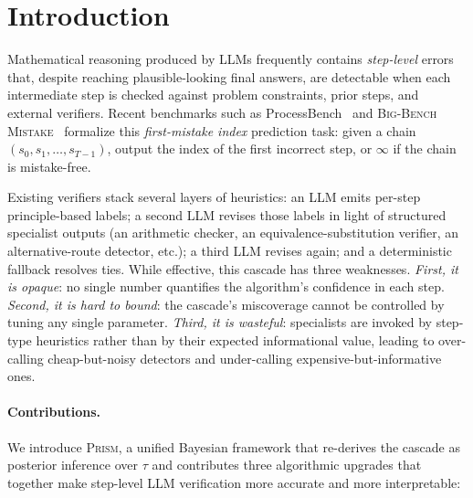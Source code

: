 \documentclass[11pt,a4paper]{article}
\theoremstyle{plain}
\theoremstyle{definition}
\theoremstyle{remark}
\begin{document}
\section{Introduction}
\label{sec:intro}

Mathematical reasoning produced by LLMs frequently contains
\emph{step-level} errors that, despite reaching plausible-looking final
answers, are detectable when each intermediate step is checked against
problem constraints, prior steps, and external verifiers. Recent
benchmarks such as ProcessBench~\citep{zheng2024processbench} and
\textsc{Big-Bench Mistake}~\citep{tyen2024llms} formalize this
\emph{first-mistake index} prediction task: given a chain
$(s_0,s_1,\dots,s_{T-1})$, output the index of the first incorrect
step, or $\infty$ if the chain is mistake-free.

Existing verifiers stack several layers of heuristics: an LLM emits
per-step principle-based labels; a second LLM revises those labels in
light of structured specialist outputs (an arithmetic checker, an
equivalence-substitution verifier, an alternative-route detector,
etc.); a third LLM revises again; and a deterministic fallback
resolves ties. While effective, this cascade has three weaknesses.
\emph{First, it is opaque}: no single number quantifies the
algorithm's confidence in each step. \emph{Second, it is hard to
bound}: the cascade's miscoverage cannot be controlled by tuning any
single parameter. \emph{Third, it is wasteful}: specialists are
invoked by step-type heuristics rather than by their expected
informational value, leading to over-calling cheap-but-noisy detectors
and under-calling expensive-but-informative ones.

\paragraph{Contributions.}
We introduce \textsc{Prism}, a unified Bayesian framework that
re-derives the cascade as posterior inference over $\tau$ and
contributes three algorithmic upgrades that together make step-level
LLM verification more accurate and more interpretable:
\end{document}
